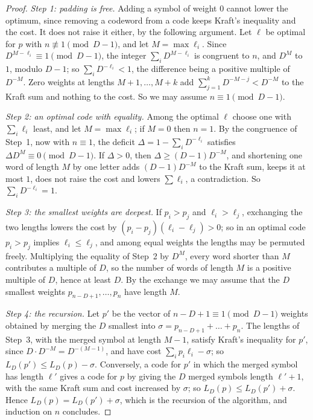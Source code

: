 \begin{proof}
\emph{Step 1: padding is free.} Adding a symbol of weight $0$ cannot lower the optimum, since removing a codeword from a code keeps Kraft's inequality and the cost. It does not raise it either, by the following argument. Let $\ell$ be optimal for $p$ with $n\not\equiv1\pmod{D-1}$, and let $M=\max\ell_{i}$. Since $D^{M-\ell_{i}}\equiv1\pmod{D-1}$, the integer $\sum_{i}D^{M-\ell_{i}}$ is congruent to $n$, and $D^{M}$ to $1$, modulo $D-1$; so $\sum_{i}D^{-\ell_{i}}<1$, the difference being a positive multiple of $D^{-M}$. Zero weights at lengths $M+1,\dots,M+k$ add $\sum_{j=1}^{k}D^{-M-j}<D^{-M}$ to the Kraft sum and nothing to the cost. So we may assume $n\equiv1\pmod{D-1}$.

\emph{Step 2: an optimal code with equality.} Among the optimal $\ell$ choose one with $\sum_{i}\ell_{i}$ least, and let $M=\max\ell_{i}$; if $M=0$ then $n=1$. By the congruence of Step~1, now with $n\equiv1$, the deficit $\Delta=1-\sum_{i}D^{-\ell_{i}}$ satisfies $\Delta D^{M}\equiv0\pmod{D-1}$. If $\Delta>0$, then $\Delta\ge(D-1)D^{-M}$, and shortening one word of length $M$ by one letter adds $(D-1)D^{-M}$ to the Kraft sum, keeps it at most $1$, does not raise the cost and lowers $\sum\ell_{i}$, a contradiction. So $\sum_{i}D^{-\ell_{i}}=1$.

\emph{Step 3: the smallest weights are deepest.} If $p_{i}>p_{j}$ and $\ell_{i}>\ell_{j}$, exchanging the two lengths lowers the cost by $(p_{i}-p_{j})(\ell_{i}-\ell_{j})>0$; so in an optimal code $p_{i}>p_{j}$ implies $\ell_{i}\le\ell_{j}$, and among equal weights the lengths may be permuted freely. Multiplying the equality of Step~2 by $D^{M}$, every word shorter than $M$ contributes a multiple of $D$, so the number of words of length $M$ is a positive multiple of $D$, hence at least $D$. By the exchange we may assume that the $D$ smallest weights $p_{n-D+1},\dots,p_{n}$ have length $M$.

\emph{Step 4: the recursion.} Let $p'$ be the vector of $n-D+1\equiv1\pmod{D-1}$ weights obtained by merging the $D$ smallest into $\sigma=p_{n-D+1}+\dots+p_{n}$. The lengths of Step~3, with the merged symbol at length $M-1$, satisfy Kraft's inequality for $p'$, since $D\cdot D^{-M}=D^{-(M-1)}$, and have cost $\sum_{i}p_{i}\ell_{i}-\sigma$; so $L_{D}(p')\le L_{D}(p)-\sigma$. Conversely, a code for $p'$ in which the merged symbol has length $\ell'$ gives a code for $p$ by giving the $D$ merged symbols length $\ell'+1$, with the same Kraft sum and cost increased by $\sigma$; so $L_{D}(p)\le L_{D}(p')+\sigma$. Hence $L_{D}(p)=L_{D}(p')+\sigma$, which is the recursion of the algorithm, and induction on $n$ concludes.
\end{proof}

